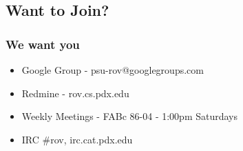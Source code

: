 \documentclass{beamer}
\begin{document}
\subsection{Want to Join?}
\frame
{
    \frametitle{We want you}

    \begin{itemize}
        \item Google Group - psu-rov@googlegroups.com
        \item Redmine - rov.cs.pdx.edu
        \item Weekly Meetings - FABc 86-04 - 1:00pm Saturdays
        \item IRC \#rov, irc.cat.pdx.edu
    \end{itemize}
}
\end{document}
